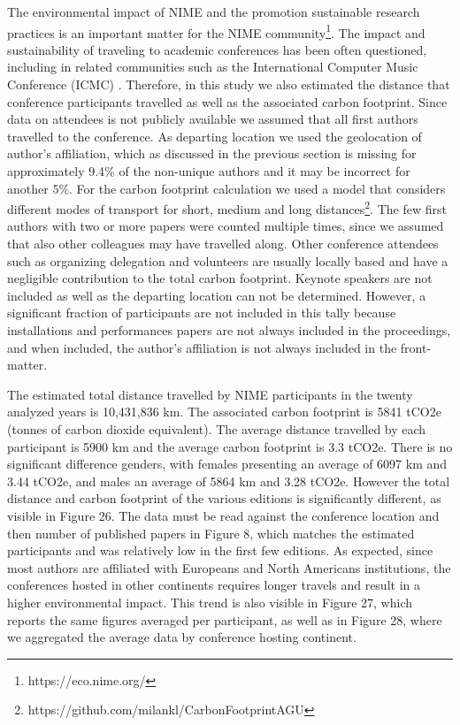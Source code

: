 \documentclass[sigconf]{nimeart}
\begin{document}
The environmental impact of NIME and the promotion sustainable research practices is an important matter for the NIME community\footnote{https://eco.nime.org/}. The impact and sustainability of traveling to academic conferences has been often questioned, including in related communities such as the International Computer Music Conference (ICMC) \cite{parncutt_letters_2019}. Therefore, in this study we also estimated the distance that conference participants travelled as well as the associated carbon footprint. Since data on attendees is not publicly available we assumed that all first authors travelled to the conference. As departing location we used the geolocation of author's affiliation, which as discussed in the previous section is missing for approximately 9.4\% of the non-unique authors and it may be incorrect for another 5\%. For the carbon footprint calculation we used a model that considers different modes of transport for short, medium and long distances\footnote{https://github.com/milankl/CarbonFootprintAGU}. The few first authors with two or more papers were counted multiple times, since we assumed that also other colleagues may have travelled along. Other conference attendees such as organizing delegation and volunteers are usually locally based and have a negligible contribution to the total carbon footprint. Keynote speakers are not included as well as the departing location can not be determined. However, a significant fraction of participants are not included in this tally because installations and performances papers are not always included in the proceedings, and when included, the author's affiliation is not always included in the front-matter.

The estimated total distance travelled by NIME participants in the twenty analyzed years is 10,431,836 km. The associated carbon footprint is 5841 tCO2e (tonnes of carbon dioxide equivalent). The average distance travelled by each participant is 5900 km and the average carbon footprint is 3.3 tCO2e. There is no significant difference genders, with females presenting an average of 6097 km and 3.44 tCO2e, and males an average of 5864 km and 3.28 tCO2e. However the total distance and carbon footprint of the various editions is significantly different, as visible in Figure 26. The data must be read against the conference location and then number of published papers in Figure 8, which matches the estimated participants and was relatively low in the first few editions. As expected, since most authors are affiliated with Europeans and North Americans institutions, the conferences hosted in other continents requires longer travels and result in a higher environmental impact. This trend is also visible in Figure 27, which reports the same figures averaged per participant, as well as in Figure 28, where we aggregated the average data by conference hosting continent.
\end{document}
